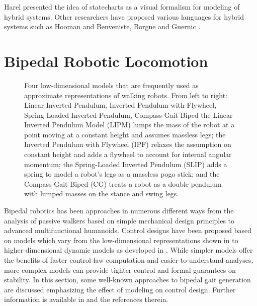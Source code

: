 Harel \cite{Harel1987} presented the idea of statecharts as a visual formalism
for modeling of hybrid systems.
%
Other researchers have proposed various languages for hybrid systems such as
Hooman \cite{Hooman1993} and Benveniste, Borgne and Guernic \cite{Benveniste1993}.




\section{Bipedal Robotic Locomotion} \label{sec:literature-bipeds}

\begin{figure}
  \centering
  \def\svgwidth{1.0\columnwidth}
  
  \caption[Four low-dimensional models]{Four low-dimensional models that are
    frequently used as approximate representations of walking robots. From left
    to right:
    Linear Inverted Pendulum, Inverted Pendulum with Flywheel, Spring-Loaded
    Inverted Pendulum, Compass-Gait Biped
    the Linear Inverted Pendulum Model (LIPM) lumps the mass of the robot at a
    point moving at a constant height and assumes massless legs;
    the Inverted Pendulum with Flywheel (IPF) relaxes the assumption on constant
    height and adds a flywheel to account for internal angular momentum;
    the Spring-Loaded Inverted Pendulum (SLIP) adds a spring to model a robot's
    legs as a massless pogo stick;
    and the Compass-Gait Biped (CG) treats a robot as a double pendulum with
    lumped masses on the stance and swing legs.}
  \label{fig:biped-models}
\end{figure}

Bipedal robotics has been approaches in numerous different ways from the
analysis of passive walkers based on simple mechanical design principles to
advanced multifunctional humanoids.
%
Control designs have been proposed based on models which vary from the
low-dimensional representations shown in  to
higher-dimensional dynamic models as developed in .
%
While simpler models offer the benefits of faster control law computation and
easier-to-understand analyses, more complex models can provide tighter control
and formal guarantees on stability.
%
In this section, some well-known approaches to bipedal gait generation
are discussed emphasizing the effect of modeling on control design.
%
Further information is available in \cite{Chevallereau2009, Full1999,
  Holmes2006, Hurmuzlu2004, Kuo2007, Sadati2012, Siciliano2008, Westervelt2007,
  Wisse2007} and the references therein.



